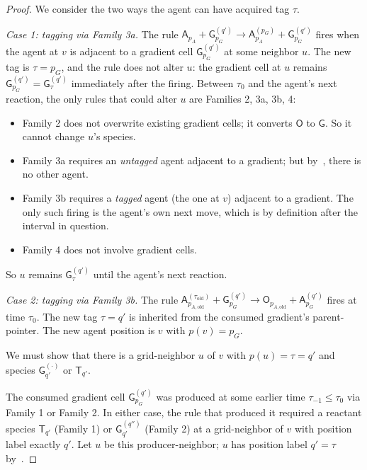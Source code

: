 \documentclass[11pt]{article}
\theoremstyle{plain}
\theoremstyle{definition}
\theoremstyle{remark}
\begin{document}
\begin{proof}
We consider the two ways the agent can have acquired tag $\tau$.

\emph{Case 1: tagging via Family 3a.} The rule $\mathsf{A}_{p_A} + \mathsf{G}^{(q')}_{p_G} \to \mathsf{A}^{(p_G)}_{p_A} + \mathsf{G}^{(q')}_{p_G}$ fires when the agent at $v$ is adjacent to a gradient cell $\mathsf{G}^{(q')}_{p_G}$ at some neighbor $u$. The new tag is $\tau = p_G$, and the rule does not alter $u$: the gradient cell at $u$ remains $\mathsf{G}^{(q')}_{p_G} = \mathsf{G}^{(q')}_\tau$ immediately after the firing. Between $\tau_0$ and the agent's next reaction, the only rules that could alter $u$ are Families 2, 3a, 3b, 4:
\begin{itemize}
    \item Family 2 does not overwrite existing gradient cells; it converts $\mathsf{O}$ to $\mathsf{G}$. So it cannot change $u$'s species.
    \item Family 3a requires an \emph{untagged} agent adjacent to a gradient; but by~, there is no other agent.
    \item Family 3b requires a \emph{tagged} agent (the one at $v$) adjacent to a gradient. The only such firing is the agent's own next move, which is by definition after the interval in question.
    \item Family 4 does not involve gradient cells.
\end{itemize}
So $u$ remains $\mathsf{G}^{(q')}_\tau$ until the agent's next reaction.

\emph{Case 2: tagging via Family 3b.} The rule $\mathsf{A}^{(\tau_{\mathrm{old}})}_{p_{A,\mathrm{old}}} + \mathsf{G}^{(q')}_{p_G} \to \mathsf{O}_{p_{A,\mathrm{old}}} + \mathsf{A}^{(q')}_{p_G}$ fires at time $\tau_0$. The new tag $\tau = q'$ is inherited from the consumed gradient's parent-pointer. The new agent position is $v$ with $p(v) = p_G$.

We must show that there is a grid-neighbor $u$ of $v$ with $p(u) = \tau = q'$ and species $\mathsf{G}^{(\cdot)}_{q'}$ or $\mathsf{T}_{q'}$.

The consumed gradient cell $\mathsf{G}^{(q')}_{p_G}$ was produced at some earlier time $\tau_{-1} \leq \tau_0$ via Family 1 or Family 2. In either case, the rule that produced it required a reactant species $\mathsf{T}_{q'}$ (Family 1) or $\mathsf{G}^{(q'')}_{q'}$ (Family 2) at a grid-neighbor of $v$ with position label exactly $q'$. Let $u$ be this producer-neighbor; $u$ has position label $q' = \tau$ by~.


\end{proof}
\end{document}
